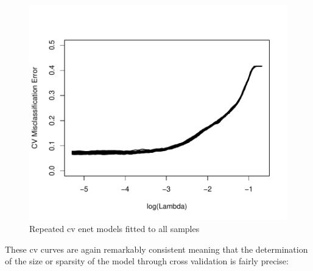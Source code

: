 \documentclass[
]{book}
\begin{document}
\begin{figure}
\centering
\includegraphics{Static/figures/enet-plot-enetAll-1.pdf}
\caption{\label{fig:enet-plot-enetAll}Repeated cv enet models fitted to all samples}
\end{figure}

These cv curves are again remarkably consistent meaning that the determination of the size or sparsity
of the model through cross validation is fairly precise:
\end{document}
